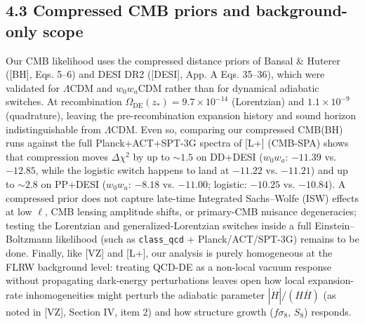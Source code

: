 \documentclass[11pt,a4paper]{article}
\begin{document}
\subsection*{4.3 Compressed CMB priors and background-only scope}
Our CMB likelihood uses the compressed distance priors of Bansal \& Huterer ([BH], Eqs. 5--6) and DESI DR2 ([DESI], App. A Eqs. 35--36), which were validated for $\Lambda$CDM and $w_0 w_a$CDM rather than for dynamical adiabatic switches. At recombination $\Omega_{\text{DE}}(z_*) = 9.7 \times 10^{-14}$ (Lorentzian) and $1.1 \times 10^{-9}$ (quadrature), leaving the pre-recombination expansion history and sound horizon indistinguishable from $\Lambda$CDM. Even so, comparing our compressed CMB(BH) runs against the full Planck+ACT+SPT-3G spectra of [L+] (CMB-SPA) shows that compression moves $\Delta\chi^2$ by up to $\sim 1.5$ on DD+DESI ($w_0 w_a$: $-11.39$ vs. $-12.85$, while the logistic switch happens to land at $-11.22$ vs. $-11.21$) and up to $\sim 2.8$ on PP+DESI ($w_0 w_a$: $-8.18$ vs. $-11.00$; logistic: $-10.25$ vs. $-10.84$). A compressed prior does not capture late-time Integrated Sachs--Wolfe (ISW) effects at low $\ell$, CMB lensing amplitude shifts, or primary-CMB nuisance degeneracies; testing the Lorentzian and generalized-Lorentzian switches inside a full Einstein--Boltzmann likelihood (such as \texttt{class\_qcd} + Planck/ACT/SPT-3G) remains to be done. Finally, like [VZ] and [L+], our analysis is purely homogeneous at the FLRW background level: treating QCD-DE as a non-local vacuum response without propagating dark-energy perturbations leaves open how local expansion-rate inhomogeneities might perturb the adiabatic parameter $|\dot{H}|/(H\overline{H})$ (as noted in [VZ], Section IV, item 2) and how structure growth ($f\sigma_8$, $S_8$) responds.
\end{document}

